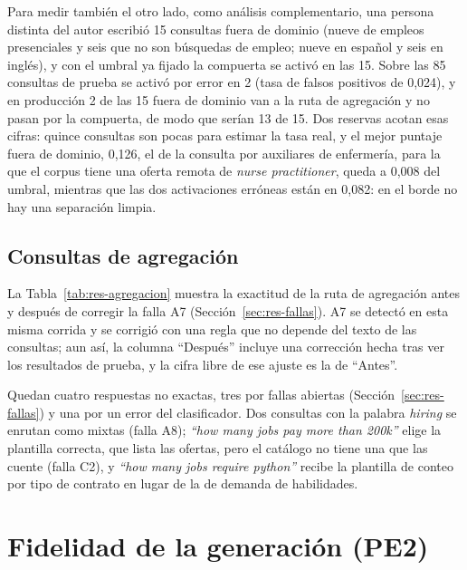 Para medir también el otro lado, como análisis complementario, una persona distinta del autor escribió 15 consultas fuera de dominio (nueve de empleos presenciales y seis que no son búsquedas de empleo; nueve en español y seis en inglés), y con el umbral ya fijado la compuerta se activó en las 15. Sobre las 85 consultas de prueba se activó por error en 2 (tasa de falsos positivos de 0,024), y en producción 2 de las 15 fuera de dominio van a la ruta de agregación y no pasan por la compuerta, de modo que serían 13 de 15. Dos reservas acotan esas cifras: quince consultas son pocas para estimar la tasa real, y el mejor puntaje fuera de dominio, 0,126, el de la consulta por auxiliares de enfermería, para la que el corpus tiene una oferta remota de \textit{nurse practitioner}, queda a 0,008 del umbral, mientras que las dos activaciones erróneas están en 0,082: en el borde no hay una separación limpia.

\subsection{Consultas de agregación}
\label{sec:res-agregacion}

La Tabla~\ref{tab:res-agregacion} muestra la exactitud de la ruta de agregación antes y después de corregir la falla A7 (Sección~\ref{sec:res-fallas}). A7 se detectó en esta misma corrida y se corrigió con una regla que no depende del texto de las consultas; aun así, la columna \enquote{Después} incluye una corrección hecha tras ver los resultados de prueba, y la cifra libre de ese ajuste es la de \enquote{Antes}.



Quedan cuatro respuestas no exactas, tres por fallas abiertas (Sección~\ref{sec:res-fallas}) y una por un error del clasificador. Dos consultas con la palabra \textit{hiring} se enrutan como mixtas (falla A8); \textit{\enquote{how many jobs pay more than 200k}} elige la plantilla correcta, que lista las ofertas, pero el catálogo no tiene una que las cuente (falla C2), y \textit{\enquote{how many jobs require python}} recibe la plantilla de conteo por tipo de contrato en lugar de la de demanda de habilidades.

\section{Fidelidad de la generación (PE2)}
\label{sec:res-pe2}

